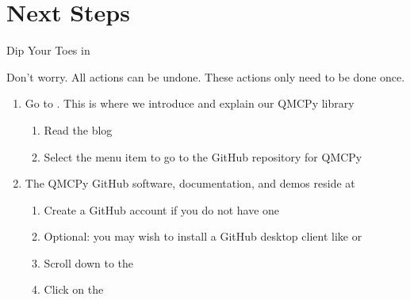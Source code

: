 \documentclass[10pt,compress,xcolor={usenames,dvipsnames},aspectratio=169]{beamer}
\begin{document}
\section{Next Steps}

\begin{frame}{Dip Your Toes in}

\vspace{-5ex}
Don't worry.  All actions can be undone.  These actions only need to be done once.

\vspace{-2ex}
\begin{enumerate}
    \item Go to \href{https://qmcpy.org}{}.  This is where we introduce and explain our QMCPy library 
    \begin{enumerate}[a]
        \item Read the blog \href{https://qmcpy.org/2020/06/25/why_add_q_to_mc/}{}
        \item Select the menu item \href{https://github.com/QMCSoftware/QMCSoftware}{} to go to the GitHub repository for QMCPy
    \end{enumerate}
    
    \item The QMCPy GitHub software, documentation, and demos reside at \href{https://github.com/QMCSoftware/QMCSoftware}{}
    \begin{enumerate}[a]
        \item Create a GitHub account if you do not have one
        \item Optional: you may wish to install a GitHub desktop client like \href{https://desktop.github.com}{} or \href{https://www.gitkraken.com}{}
        \item Scroll down to the \href{https://github.com/QMCSoftware/QMCSoftware/\#readme}{} 
        \item Click on the \href{https://github.com/QMCSoftware/QMCSoftware/blob/master/CONTRIBUTING.md}{}
    \end{enumerate}


\end{enumerate}
\end{frame}
\end{document}
